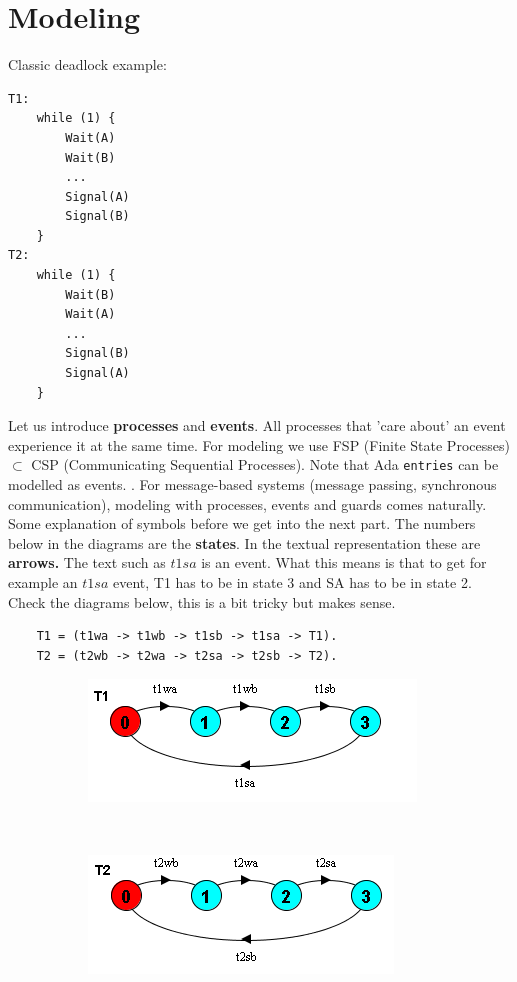\section{Modeling}
Classic deadlock example:
\begin{verbatim}
T1:
    while (1) {
        Wait(A)
        Wait(B)
        ...
        Signal(A)
        Signal(B)
    }
T2:
    while (1) {
        Wait(B)
        Wait(A)
        ... 
        Signal(B)
        Signal(A)
    }
\end{verbatim}
Let us introduce \textbf{processes} and \textbf{events}. All processes that 'care about' an event experience it at the same time. For modeling we use FSP (Finite State Processes) $\subset$ CSP (Communicating Sequential Processes). Note that Ada \texttt{entries} can be modelled as events. . For message-based systems (message passing, synchronous communication), modeling with processes, events and guards comes naturally. Some explanation of symbols before we get into the next part. The numbers below in the diagrams are the \textbf{states}. In the textual representation these are \textbf{arrows.} The text such as $t1sa$ is an event. What this means is that to get for example an $t1sa$ event, T1 has to be in state 3 and SA has to be in state 2. Check the diagrams below, this is a bit tricky but makes sense.
\begin{verbatim}
    T1 = (t1wa -> t1wb -> t1sb -> t1sa -> T1).
    T2 = (t2wb -> t2wa -> t2sa -> t2sb -> T2).
\end{verbatim}
\begin{figure}[H]
\centering
\begin{subfigure}{.5\textwidth}
\centering
\includegraphics[width=.9\linewidth]{figures/Modeling concurrent programs/Example1/T1.PNG}
\end{subfigure}%
~
\begin{subfigure}{.5\textwidth}
\centering
\includegraphics[width=.9\linewidth]{figures/Modeling concurrent programs/Example1/T2.PNG}
\end{subfigure}
\end{figure}

